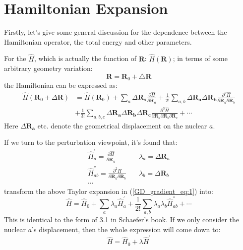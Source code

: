 \section{Hamiltonian Expansion}
%
%
%
Firstly, let's give some general discussion for the dependence between the
Hamiltonian operator, the total energy and other parameters.

For the $\hat{H}$, which is actually the function of $\bm{R}$:
$\hat{H}(\bm{R})$; in terms of some arbitrary geometry variation:
\begin{equation}
 \bm{R} = \bm{R}_{0} + \bigtriangleup\bm{R}
\end{equation}
the Hamiltonian can be expressed as:
\begin{equation}
\label{GD_gradient_eq:1} 
\begin{split}
 \hat{H}(\bm{R}_{0} + \Delta\bm{R}) &= \hat{H}(\bm{R}_{0}) + 
\sum_{a}\Delta\bm{R}_{a}\frac{\partial \hat{H}}{\partial \bm{R}_{a}} + 
\frac{1}{2!}\sum_{a,b}\Delta\mathbf{R_{a}}\Delta\mathbf{R_{b}}\frac{\partial^{2}
\hat{H}}{\partial \bm{R}_{a}\partial \bm{R}_{b}} \\
    & +
    \frac{1}{3!}\sum_{a,b,c}\Delta\mathbf{R_{a}}\Delta\mathbf{R_{b}}
    \Delta\mathbf{R_{c}}\frac{\partial^{3}
\hat{H}}{\partial \bm{R}_{a}\partial \bm{R}_{b}\partial \bm{R}_{c}} + \cdots
\end{split}
\end{equation}
Here $\Delta\mathbf{R_{a}}$ etc. denote the geometrical displacement on the
nuclear $a$. 

If we turn to the perturbation viewpoint, it's found that:
\begin{align}
 \label{GD_gradient_eq:2}
\hat{H}^{'}_{a} = \frac{\partial \hat{H}}{\partial \bm{R}_{a}} &\quad
\lambda_{a} = \Delta\bm{R}_{a} \nonumber \\
\hat{H}^{''}_{ab} = \frac{\partial^{2} \hat{H}}{\partial \bm{R}_{a}\partial
\bm{R}_{b}} &\quad \lambda_{b} =
\Delta\bm{R}_{b} \nonumber \\
\cdots
\end{align}
transform the above Taylor expansion in (\ref{GD_gradient_eq:1}) into:
\begin{equation}
 \label{GD_gradient_eq:3}
 \hat{H} = \hat{H}_{0} + \sum_{a}\lambda_{a}\hat{H}^{'}_{a} +
\frac{1}{2!}\sum_{a,b}\lambda_{a}\lambda_{b}\hat{H}^{''}_{ab} + \cdots
\end{equation}
This is identical to the form of 3.1 in Schaefer's
book\cite{New_Dimension_for_Derivatives_Calculation}. If we only consider the
nuclear $a$'s displacement, then the whole expression will come down to:
\begin{equation}
\label{GD_gradient_eq:7}
 \hat{H} = \hat{H}_{0} + \lambda\hat{H}^{'}
\end{equation}

